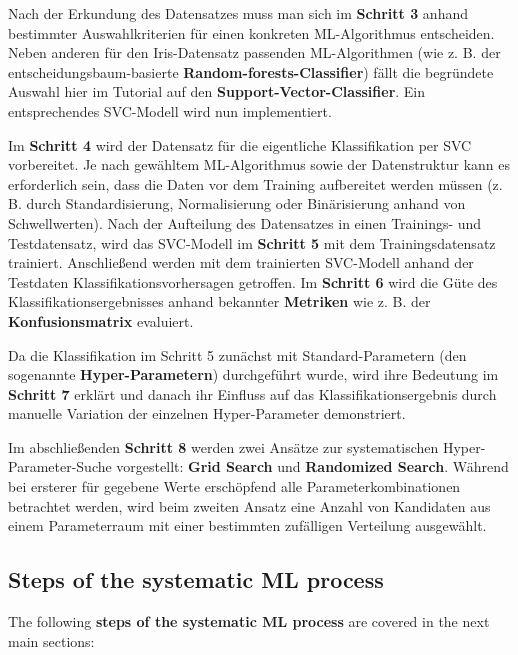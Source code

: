 \documentclass [oneside,10pt,a4paper,ngerman,BCOR10mm,headsepline,parindent,final]{scrartcl}
\begin{document}
Nach der Erkundung des Datensatzes muss man sich im \textbf{Schritt 3}
anhand bestimmter Auswahlkriterien für einen konkreten ML-Algorithmus
entscheiden. Neben anderen für den Iris-Datensatz passenden
ML-Algorithmen (wie z. B. der entscheidungsbaum-basierte
\textbf{Random-forests-Classifier}) fällt die begründete Auswahl hier im
Tutorial auf den \textbf{Support-Vector-Classifier}. Ein entsprechendes
SVC-Modell wird nun implementiert.

Im \textbf{Schritt 4} wird der Datensatz für die eigentliche
Klassifikation per SVC vorbereitet. Je nach gewähltem ML-Algorithmus
sowie der Datenstruktur kann es erforderlich sein, dass die Daten vor
dem Training aufbereitet werden müssen (z. B. durch Standardisierung,
Normalisierung oder Binärisierung anhand von Schwellwerten). Nach der
Aufteilung des Datensatzes in einen Trainings- und Testdatensatz, wird
das SVC-Modell im \textbf{Schritt 5} mit dem Trainingsdatensatz
trainiert. Anschließend werden mit dem trainierten SVC-Modell anhand der
Testdaten Klassifikationsvorhersagen getroffen. Im \textbf{Schritt 6}
wird die Güte des Klassifikationsergebnisses anhand bekannter
\textbf{Metriken} wie z. B. der \textbf{Konfusionsmatrix} evaluiert.

Da die Klassifikation im Schritt 5 zunächst mit Standard-Parametern (den
sogenannte \textbf{Hyper-Parametern}) durchgeführt wurde, wird ihre
Bedeutung im \textbf{Schritt 7} erklärt und danach ihr Einfluss auf das
Klassifikationsergebnis durch manuelle Variation der einzelnen
Hyper-Parameter demonstriert.

Im abschließenden \textbf{Schritt 8} werden zwei Ansätze zur
systematischen Hyper-Parameter-Suche vorgestellt: \textbf{Grid Search}
und \textbf{Randomized Search}. Während bei ersterer für gegebene Werte
erschöpfend alle Parameterkombinationen betrachtet werden, wird beim
zweiten Ansatz eine Anzahl von Kandidaten aus einem Parameterraum mit
einer bestimmten zufälligen Verteilung ausgewählt.

    \hypertarget{steps-of-the-systematic-ml-process}{%
\subsection{Steps of the systematic ML
process}\label{steps-of-the-systematic-ml-process}}

The following \textbf{steps of the systematic ML process} are covered in
the next main sections:
\end{document}
